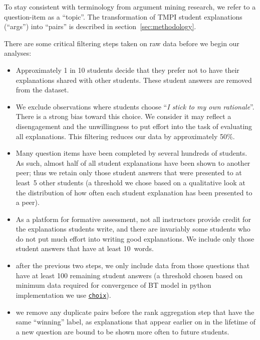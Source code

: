 \documentclass[notitlepage,12pt]{jedm}
\begin{document}
To stay consistent with terminology from argument mining research, we 
refer to a question-item as a ``topic''.
The transformation of TMPI student explanations (``args'') into ``pairs'' is 
described in section~\ref{sec:methodology}. 

There are some critical filtering steps taken on raw data before we begin our 
analyses:
\begin{itemize}
	\item Approximately 1 in 10 students decide that they prefer not to have  
	their explanations shared with other students.
	These student answers are removed from the dataset.
	\item We exclude observations where students choose ``\textit{I stick to 
	  my own rationale}''.
	There is a strong bias toward this choice. We consider it may reflect a disengagement and the unwillingness to
        put effort into the task of evaluating all explanations. This filtering reduces our data by approximately 50\%.
	\item Many question items have been completed by several hundreds of 
	students.
	As such, almost half of all student explanations have been shown 
	to another peer; thus we retain only those student answers that were
	presented to at least~5 other students (a threshold we chose based on a 
	qualitative look at the distribution of how often each student explanation 
	has been presented to a peer).
	\item As a platform for formative assessment, not all instructors provide 
	credit for the explanations students write, and there are invariably some 
	students who do not put much effort into writing good explanations.
	We include only those student answers that have at least 10~words.
	\item after the previous two steps, we only include data from those 
	questions that have at least 100 remaining student answers (a threshold 
	chosen based on minimum data required for convergence of BT model in python 
	implementation we use {\href{http://choix.lum.li/en/latest/}{\texttt{choix}}}).
	\item we remove any duplicate pairs before the rank aggregation step that 
	have the same ``winning'' label, as explanations that appear earlier on in 
	the lifetime of a new question are bound to be shown more often to future 
	students.
\end{itemize}
\end{document}
